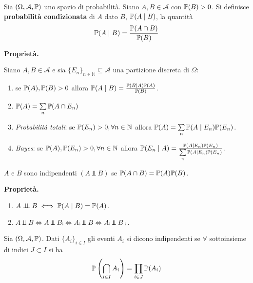 
\ParteEsercizi

\begin{definition}
	Sia $(\Omega ,\mathcal{A} ,\mathbb{P})$ uno spazio di probabilità. Siano $A,B\in \mathcal{A}$ con $\mathbb{P}(B)  >0$. Si definisce \textbf{probabilità condizionata} di $A$ dato $B$, $\mathbb{P}(A\mid B)$, la quantità
	\begin{equation*}
		\mathbb{P}(A\mid B) =\frac{\mathbb{P}(A\cap B)}{\mathbb{P}(B)}
	\end{equation*}
\end{definition}
\textbf{Proprietà.}

Siano $A,B\in \mathcal{A}$ e sia $\{E_{n}\}_{n\in \mathbb{N}} \subseteq \mathcal{A}$ una partizione discreta di $\Omega $:
\begin{enumerate}
	\item se $\mathbb{P}(A) ,\mathbb{P}(B)  >0$ allora $\mathbb{P}(A\mid B) =\frac{\mathbb{P}(B\mid A)\mathbb{P}(A)}{\mathbb{P}(B)}$.
	\item $\mathbb{P}(A) =\sum\limits _{n}\mathbb{P}(A\cap E_{n})$
	\item \textit{Probabilità totali}: se $\mathbb{P}(E_{n})  >0,\forall n\in \mathbb{N}$ allora $\mathbb{P}(A) =\sum\limits _{n}\mathbb{P}(A\mid E_{n})\mathbb{P}(E_{n})$.
	\item \textit{Bayes}: se $\mathbb{P}(A) ,\mathbb{P}(E_{n})  >0,\forall n\in \mathbb{N}$ allora $\mathbb{P}(E_{n} \mid A) =\frac{\mathbb{P}(A\mid E_{n})\mathbb{P}(E_{n})}{\sum\limits _{n}\mathbb{P}(A\mid E_{n})\mathbb{P}(E_{n})}$.
\end{enumerate}
\begin{definition}
	$A$ e $B$ sono indipendenti $(A\Bot B)$ se $\mathbb{P}(A\cap B) =\mathbb{P}(A)\mathbb{P}(B)$.
\end{definition}
\textbf{Proprietà.}
\begin{enumerate}
	\item $A\perp \!\!\! \perp B\iff \mathbb{P}(A\mid B) =\mathbb{P}(A)$.
	\item $A\Bot B\iff A\Bot B\comp \iff A\comp \Bot B\iff A\comp \Bot B\comp$.
\end{enumerate}
\begin{definition}
	Sia $(\Omega ,\mathcal{A} ,\mathbb{P})$. Dati $\{A_{i}\}_{i\in I}$ gli eventi $A_{i}$ si dicono indipendenti se $\forall $ sottoinsieme di indici $J\subset I$ si ha
	\begin{equation*}
		\mathbb{P}\left(\bigcap _{i\in I} A_{i}\right) =\prod _{i\in J}\mathbb{P}(A_{i})
	\end{equation*}
\end{definition}

\Esercizio{}

